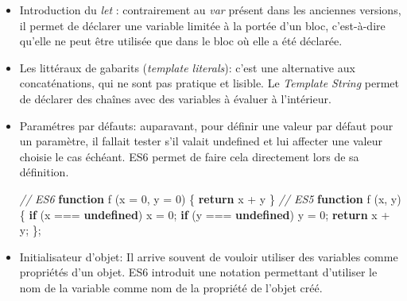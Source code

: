 \documentclass[12pt,a4paper]{article}
\newenvironment{Shaded}{}{}
\newcommand{\KeywordTok}[1]{\textcolor[rgb]{0.00,0.44,0.13}{\textbf{{#1}}}}
\newcommand{\DecValTok}[1]{\textcolor[rgb]{0.25,0.63,0.44}{{#1}}}
\newcommand{\SpecialCharTok}[1]{\textcolor[rgb]{0.25,0.44,0.63}{{#1}}}
\newcommand{\StringTok}[1]{\textcolor[rgb]{0.25,0.44,0.63}{{#1}}}
\newcommand{\VerbatimStringTok}[1]{\textcolor[rgb]{0.25,0.44,0.63}{{#1}}}
\newcommand{\CommentTok}[1]{\textcolor[rgb]{0.38,0.63,0.69}{\textit{{#1}}}}
\newcommand{\ControlFlowTok}[1]{\textcolor[rgb]{0.00,0.44,0.13}{\textbf{{#1}}}}
\newcommand{\OperatorTok}[1]{\textcolor[rgb]{0.40,0.40,0.40}{{#1}}}
\newcommand{\AttributeTok}[1]{\textcolor[rgb]{0.49,0.56,0.16}{{#1}}}
\newcommand{\NormalTok}[1]{{#1}}
\begin{document}
  \begin{itemize}
  \item
    Introduction du \emph{let} : contrairement au \emph{var} présent dans
    les anciennes versions, il permet de déclarer une variable limitée à
    la portée d'un bloc, c'est-à-dire qu'elle ne peut être utilisée que
    dans le bloc où elle a été déclarée.
  \item
    Les littéraux de gabarits (\emph{template literals}): c'est une
    alternative aux concaténations, qui ne sont pas pratique et lisible.
    Le \emph{Template String} permet de déclarer des chaînes avec des
    variables à évaluer à l'intérieur.

  \begin{Shaded}
  \end{Shaded}
  \item
    Paramétres par défauts: auparavant, pour définir une valeur par défaut
    pour un paramètre, il fallait tester s'il valait undefined et lui
    affecter une valeur choisie le cas échéant. ES6 permet de faire cela
    directement lors de sa définition.

  \begin{Shaded}
  \begin{Highlighting}[]
  \CommentTok{// ES6}
  \KeywordTok{function} \AttributeTok{f} \NormalTok{(x }\OperatorTok{=} \DecValTok{0}\OperatorTok{,} \NormalTok{y }\OperatorTok{=} \DecValTok{0}\NormalTok{) }\OperatorTok{\{}
      \ControlFlowTok{return} \NormalTok{x }\OperatorTok{+} \NormalTok{y}
  \OperatorTok{\}}
  \CommentTok{// ES5}
  \KeywordTok{function} \AttributeTok{f} \NormalTok{(x}\OperatorTok{,} \NormalTok{y) }\OperatorTok{\{}
      \ControlFlowTok{if} \NormalTok{(x }\OperatorTok{===} \KeywordTok{undefined}\NormalTok{)}
          \NormalTok{x }\OperatorTok{=} \DecValTok{0}\OperatorTok{;}
      \ControlFlowTok{if} \NormalTok{(y }\OperatorTok{===} \KeywordTok{undefined}\NormalTok{)}
          \NormalTok{y }\OperatorTok{=} \DecValTok{0}\OperatorTok{;}
      \ControlFlowTok{return} \NormalTok{x }\OperatorTok{+} \NormalTok{y}\OperatorTok{;}
  \OperatorTok{\};}
  \end{Highlighting}
  \end{Shaded}
  \item
    Initialisateur d'objet: Il arrive souvent de vouloir utiliser des
    variables comme propriétés d'un objet. ES6 introduit une notation
    permettant d'utiliser le nom de la variable comme nom de la propriété
    de l'objet créé.


\end{itemize}
\end{document}
